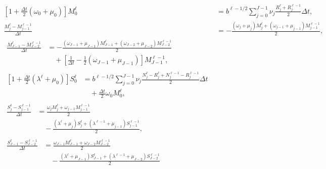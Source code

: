 \documentclass{jpmarticle}
\let\subequationsorig\subequations%
\let\endsubequationsorig\endsubequations%
\renewenvironment{subequations}{
  \subequationsorig
  \renewcommand{\theequation}{\theparentequation.\arabic{equation}}
}{
  \endsubequationsorig
}
\begin{document}
\begin{subequations}
  \label{numerics_age_and_time_since_entry_structured_agg_tse}
  \begin{align}
    \left[1 + \frac{\Delta t}{2} (\omega_0 + \mu_0)\right] M_0^{\ell}
    &= b^{\ell - 1 / 2}
    \sum_{j = 0}^{J - 1} \nu_j \frac{R_j^{\ell} + R_j^{\ell - 1}}{2}
    \Delta t,
    \\
    \frac{M_j^{\ell} - M_{j - 1}^{\ell - 1}}{\Delta t}
    &=
    - \frac{(\omega_j + \mu_j) M_j^{\ell}
      + (\omega_{j - 1} + \mu_{j - 1}) M_{j - 1}^{\ell - 1}}
    {2},
    \\
    \begin{split}
      \frac{M_{J - 1}^{\ell} - M_{J - 2}^{\ell - 1}}{\Delta t}
      &= - \frac{(\omega_{J - 1} + \mu_{J - 1}) M_{J - 1}^{\ell}
        + (\omega_{J - 2} + \mu_{J - 2}) M_{J - 2}^{\ell - 1}}
      {2}
      \\ & \quad {}
      +  \left[\frac{1}{\Delta t}
        - \frac{1}{2} (\omega_{J - 1} + \mu_{J - 1})\right]
      M_{J - 1}^{\ell - 1},
    \end{split}
    \\
    \begin{split}
      \left[1 + \frac{\Delta t}{2} (\lambda^{\ell} + \mu_0)\right] S_0^{\ell}
      &= b^{\ell - 1 / 2}
      \sum_{j = 0}^{J - 1} \nu_j
      \frac{N_j^{\ell} - R_j^{\ell} + N_j^{\ell - 1} - R_j^{\ell - 1}}
      {2}
      \Delta t
      \\ & \quad {}
      + \frac{\Delta t}{2} \omega_0 M_0^{\ell},
    \end{split}
    \\
    \begin{split}
      \frac{S_j^{\ell} - S_{j - 1}^{\ell - 1}}{\Delta t}
      &= \frac{\omega_j M_j^{\ell}
        + \omega_{j - 1} M_{j - 1}^{\ell - 1}}
      {2}
      \\ & \quad {}
      - \frac{(\lambda^{\ell} + \mu_j) S_j^{\ell}
        + (\lambda^{\ell - 1} + \mu_{j - 1}) S_{j - 1}^{\ell - 1}}
      {2},
    \end{split}
    \\
    \begin{split}
      \frac{S_{J - 1}^{\ell} - S_{J - 2}^{\ell - 1}}{\Delta t}
      &= \frac{\omega_{J - 1} M_{J - 1}^{\ell}
        + \omega_{J - 2} M_{J - 2}^{\ell - 1}}
      {2}
      \\ & \quad {}
      - \frac{(\lambda^{\ell} + \mu_{J - 1}) S_{J - 1}^{\ell}
        + (\lambda^{\ell - 1} + \mu_{J - 2}) S_{J - 2}^{\ell - 1}}
      {2}
      \\ & \quad {}

\end{split}
\end{align}
\end{subequations}
\end{document}
